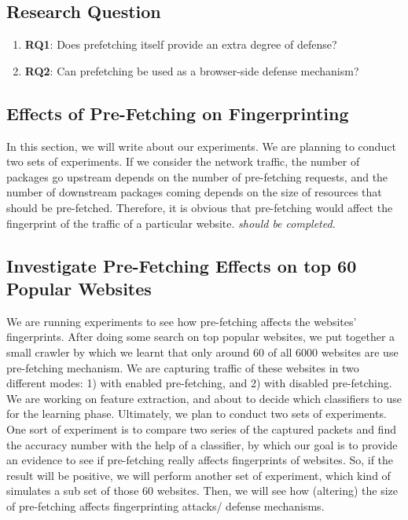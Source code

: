 
\subsection{Research Question}

\begin{enumerate}
\item
{\bf RQ1}: Does prefetching itself provide an extra degree of defense?
\item
{\bf RQ2}: Can prefetching be used as a browser-side defense mechanism?
\end{enumerate}

\subsection{Effects of Pre-Fetching on Fingerprinting}
In this section, we will write  about our experiments. We are planning to conduct two sets of experiments. If we consider the network traffic, the number of packages go upstream depends on the number of pre-fetching requests, and the number of downstream packages coming depends on the size of resources that should be pre-fetched. Therefore, it is obvious that pre-fetching would affect the fingerprint of the traffic of a particular website.  \emph{should be completed.}

\subsection{Investigate Pre-Fetching Effects on top 60 Popular Websites}
We are running experiments to see how pre-fetching affects the websites' fingerprints.
After doing some search on top popular websites, we put together a small crawler by which we learnt that only around 60 of all 6000 websites are use pre-fetching mechanism. We are capturing traffic of these websites in two different modes: 1) with enabled pre-fetching, and 2) with disabled pre-fetching. We are working on feature extraction, and about to decide which classifiers to use for the learning phase.
Ultimately, we plan to conduct two sets of experiments. One sort of experiment is to compare two series of the captured packets and find the accuracy number with the help of a classifier, by which our goal is to provide an evidence to see if pre-fetching really affects fingerprints of websites. So, if the result will be positive, we will perform another set of experiment, which kind of simulates a sub set of those 60 websites. Then, we will see how (altering) the size of pre-fetching affects fingerprinting attacks/ defense mechanisms.


